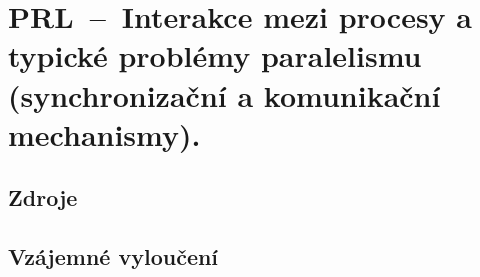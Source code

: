 

\graphicspath{{prl/interakce_mezi_procesy/figures}}


\chapter{PRL~--~Interakce mezi procesy a typické problémy paralelismu (synchronizační a komunikační mechanismy).}


\section{Zdroje}

\begin{compactitem}
    \item {}
    \item {}
    \item {}
\end{compactitem}


\section{Vzájemné vyloučení}

